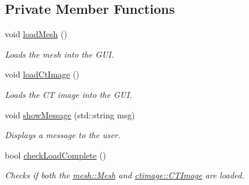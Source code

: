 \subsection*{Private Member Functions}
\begin{DoxyCompactItemize}
\item 
\hypertarget{classgui_1_1_main_window_a9b53ad68c9a10d546ce4b4d171413e99}{
void \hyperlink{classgui_1_1_main_window_a9b53ad68c9a10d546ce4b4d171413e99}{loadMesh} ()}
\label{classgui_1_1_main_window_a9b53ad68c9a10d546ce4b4d171413e99}

\begin{DoxyCompactList}\small\item\em Loads the mesh into the GUI. \item\end{DoxyCompactList}\item 
\hypertarget{classgui_1_1_main_window_afbfceb6a660dff0cc5938e1783df41b4}{
void \hyperlink{classgui_1_1_main_window_afbfceb6a660dff0cc5938e1783df41b4}{loadCtImage} ()}
\label{classgui_1_1_main_window_afbfceb6a660dff0cc5938e1783df41b4}

\begin{DoxyCompactList}\small\item\em Loads the CT image into the GUI. \item\end{DoxyCompactList}\item 
void \hyperlink{classgui_1_1_main_window_ad47a9433cd59b71e66643004d182907d}{showMessage} (std::string msg)
\begin{DoxyCompactList}\small\item\em Displays a message to the user. \item\end{DoxyCompactList}\item 
bool \hyperlink{classgui_1_1_main_window_a85d3a7d16217e99e0fedcf0c65107f99}{checkLoadComplete} ()
\begin{DoxyCompactList}\small\item\em Checks if both the \hyperlink{classmesh_1_1_mesh}{mesh::Mesh} and \hyperlink{classctimage_1_1_c_t_image}{ctimage::CTImage} are loaded. \item\end{DoxyCompactList}\end{DoxyCompactItemize}
